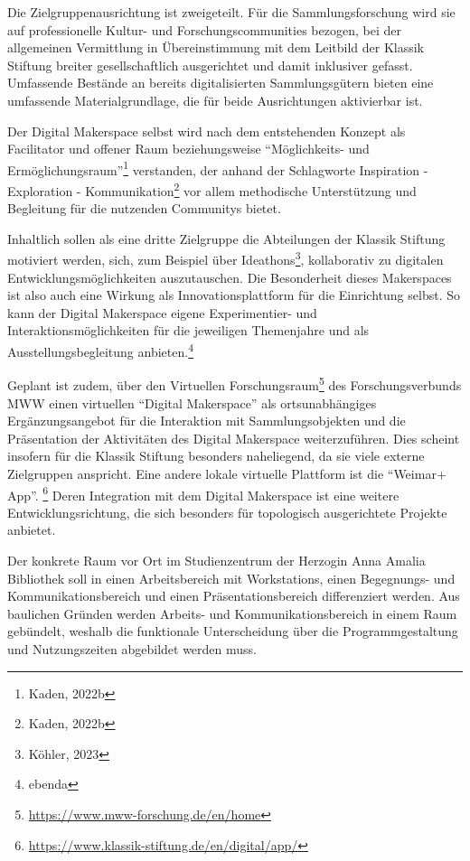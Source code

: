 \documentclass[a4paper,
fontsize=11pt,
oneside,
numbers=noperiodatend,
parskip=half-,
bibliography=totoc,
final
]{scrartcl}
\begin{document}
Die Zielgruppenausrichtung ist zweigeteilt. Für die Sammlungsforschung
wird sie auf professionelle Kultur- und Forschungscommunities bezogen,
bei der allgemeinen Vermittlung in Übereinstimmung mit dem Leitbild der
Klassik Stiftung breiter gesellschaftlich ausgerichtet und damit
inklusiver gefasst. Umfassende Bestände an bereits digitalisierten
Sammlungsgütern bieten eine umfassende Materialgrundlage, die für beide
Ausrichtungen aktivierbar ist.

Der Digital Makerspace selbst wird nach dem entstehenden Konzept als
Facilitator und offener Raum beziehungsweise \enquote{Möglichkeits- und
Ermöglichungsraum}\footnote{Kaden, 2022b} verstanden, der anhand der
Schlagworte Inspiration - Exploration - Kommunikation\footnote{Kaden,
  2022b} vor allem methodische Unterstützung und Begleitung für die
nutzenden Communitys bietet.

Inhaltlich sollen als eine dritte Zielgruppe die Abteilungen der Klassik
Stiftung motiviert werden, sich, zum Beispiel über Ideathons\footnote{Köhler,
  2023}, kollaborativ zu digitalen Entwicklungsmöglichkeiten
auszutauschen. Die Besonderheit dieses Makerspaces ist also auch eine
Wirkung als Innovationsplattform für die Einrichtung selbst. So kann der
Digital Makerspace eigene Experimentier- und Interaktionsmöglichkeiten
für die jeweiligen Themenjahre und als Ausstellungsbegleitung
anbieten.\footnote{ebenda}

Geplant ist zudem, über den Virtuellen Forschungsraum\footnote{\url{https://www.mww-forschung.de/en/home}}
des Forschungsverbunds MWW einen virtuellen \enquote{Digital Makerspace}
als ortsunabhängiges Ergänzungsangebot für die Interaktion mit
Sammlungsobjekten und die Präsentation der Aktivitäten des Digital
Makerspace weiterzuführen. Dies scheint insofern für die Klassik
Stiftung besonders naheliegend, da sie viele externe Zielgruppen
anspricht. Eine andere lokale virtuelle Plattform ist die
\enquote{Weimar+ App}. \footnote{\url{https://www.klassik-stiftung.de/en/digital/app/}}
Deren Integration mit dem Digital Makerspace ist eine weitere
Entwicklungsrichtung, die sich besonders für topologisch ausgerichtete
Projekte anbietet.

Der konkrete Raum vor Ort im Studienzentrum der Herzogin Anna Amalia
Bibliothek soll in einen Arbeitsbereich mit Workstations, einen
Begegnungs- und Kommunikationsbereich und einen Präsentationsbereich
differenziert werden. Aus baulichen Gründen werden Arbeits- und
Kommunikationsbereich in einem Raum gebündelt, weshalb die funktionale
Unterscheidung über die Programmgestaltung und Nutzungszeiten abgebildet
werden muss.
\end{document}
